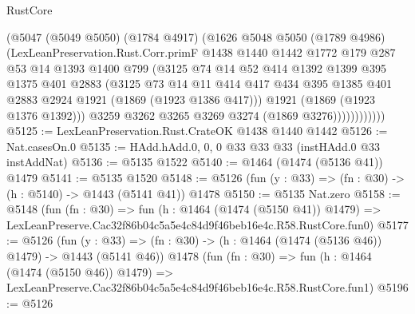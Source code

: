 \begin{lexlean}{RustCore}
\begin{coremodule}
                    (@5047
                      (@5049 @5050)
                      (@1784 @4917)
                      (@1626
                        @5048
                        @5050
                        (@1789 @4986)
                        (LexLeanPreservation.Rust.Corr.primF
                          @1438
                          @1440
                          @1442
                          @1772
                          @179
                          @287
                          @53
                          @14
                          @1393
                          @1400
                          @799
                          (@3125
                            @74
                            @14
                            @52
                            @414
                            @1392
                            @1399
                            @395
                            @1375
                            @401
                            @2883
                            (@3125
                              @73
                              @14
                              @11
                              @414
                              @417
                              @434
                              @395
                              @1385
                              @401
                              @2883
                              @2924
                              @1921
                              (@1869 (@1923 @1386 @417)))
                            @1921
                            (@1869 (@1923 @1376 @1392)))
                          @3259
                          @3262
                          @3265
                          @3269
                          @3274
                          (@1869 @3276))))))))))))
@5125 := LexLeanPreservation.Rust.CrateOK @1438 @1440 @1442
@5126 := Nat.casesOn.{0}
@5135 := HAdd.hAdd.{0, 0, 0} @33 @33 @33 (instHAdd.{0} @33 instAddNat)
@5136 := @5135 @1522
@5140 := @1464 (@1474 (@5136 @41)) @1479
@5141 := @5135 @1520
@5148 := @5126 (fun (y : @33) => (fn : @30) -> (h : @5140) -> @1443 (@5141 @41)) @1478
@5150 := @5135 Nat.zero
@5158 := @5148
    (fun (fn : @30) =>
    fun (h : @1464 (@1474 (@5150 @41)) @1479) =>
    LexLeanPreserve.Cac32f86b04c5a5e4c84d9f46beb16e4c.R58.RustCore.fun0)
@5177 := @5126
    (fun (y : @33) => (fn : @30) -> (h : @1464 (@1474 (@5136 @46)) @1479) -> @1443 (@5141 @46))
    @1478
    (fun (fn : @30) =>
    fun (h : @1464 (@1474 (@5150 @46)) @1479) =>
    LexLeanPreserve.Cac32f86b04c5a5e4c84d9f46beb16e4c.R58.RustCore.fun1)
@5196 := @5126

\end{coremodule}
\end{lexlean}
